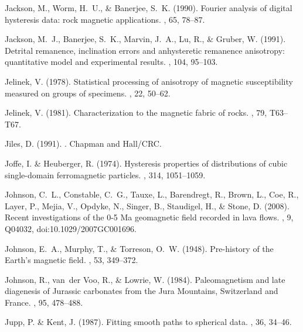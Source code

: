 Jackson, M., Worm, H.~U., \& Banerjee, S.~K. (1990).
\newblock Fourier analysis of digital hysteresis data: rock magnetic
  applications.
, 65, 78--87.

Jackson, M.~J., Banerjee, S.~K., Marvin, J.~A., Lu, R., \& Gruber, W. (1991).
\newblock Detrital remanence, inclination errors and anhysteretic remanence
  anisotropy: quantitative model and experimental results.
, 104, 95--103.

Jelinek, V. (1978).
\newblock Statistical processing of anisotropy of magnetic susceptibility
  measured on groups of specimens.
, 22, 50--62.

Jelinek, V. (1981).
\newblock Characterization to the magnetic fabric of rocks.
, 79, T63--T67.

Jiles, D. (1991).
.
\newblock Chapman and Hall/CRC.

Joffe, I. \& Heuberger, R. (1974).
\newblock Hysteresis properties of distributions of cubic single-domain
  ferromagnetic particles.
, 314, 1051--1059.

Johnson, C.~L., Constable, C.~G., Tauxe, L., Barendregt, R., Brown, L., Coe,
  R., Layer, P., Mejia, V., Opdyke, N., Singer, B., Staudigel, H., \& Stone, D.
  (2008).
\newblock Recent investigations of the 0-5 Ma geomagnetic field recorded in
  lava flows.
, 9, Q04032,
  doi:10.1029/2007GC001696.

Johnson, E.~A., Murphy, T., \& Torreson, O.~W. (1948).
\newblock Pre-history of the Earth's magnetic field.
, 53, 349--372.

Johnson, R., van~der Voo, R., \& Lowrie, W. (1984).
\newblock Paleomagnetism and late diagenesis of Jurassic carbonates from the
  Jura Mountains, Switzerland and France.
, 95, 478--488.

Jupp, P. \& Kent, J. (1987).
\newblock Fitting smooth paths to spherical data.
, 36, 34--46.

